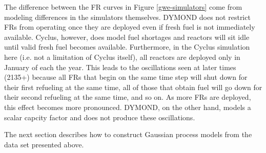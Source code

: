 The difference between the FR curves in Figure \ref{gwe-simulators} come
from modeling differences in the simulators themselves. DYMOND does not 
restrict FRs from operating once they are deployed even if fresh fuel is not 
immediately available. Cyclus, however, does model fuel shortages and 
reactors will sit idle until valid fresh fuel becomes available. Furthermore, 
in the Cyclus simulation here (i.e. not a limitation of Cyclus itself), 
all reactors are deployed only in January of each the year.
This leads to the oscillations seen at later times (2135+) because all 
FRs that begin on the same time step will shut down for their first
refueling at the same time, all of those that obtain fuel will go down for 
their second refueling at the same time, and so on. As more FRs are deployed, 
this effect becomes more pronounced. DYMOND, on the other hand, models a 
scalar capcity factor and does not produce these oscillations.

The next section describes how to
construct Gaussian process models from the data set presented above.

\clearpage
